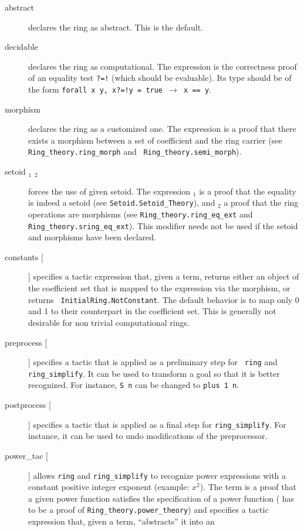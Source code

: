 \begin{description}
\item[abstract] declares the ring as abstract. This is the default.
\item[decidable \term] declares the ring as computational. The expression
  \term{} is
  the correctness proof of an equality test {\tt ?=!} (which should be
  evaluable). Its type should be of
  the form {\tt forall x y, x?=!y = true $\rightarrow$ x == y}.
\item[morphism \term] declares the ring as a customized one. The expression
  \term{} is
  a proof that there exists a morphism between a set of coefficient
  and the ring carrier (see {\tt Ring\_theory.ring\_morph} and {\tt
  Ring\_theory.semi\_morph}).
\item[setoid \term$_1$ \term$_2$] forces the use of given setoid. The
  expression \term$_1$ is a proof that the equality is indeed a setoid
  (see {\tt Setoid.Setoid\_Theory}), and \term$_2$ a proof that the
  ring operations are morphisms (see {\tt Ring\_theory.ring\_eq\_ext} and
  {\tt Ring\_theory.sring\_eq\_ext}). This modifier needs not be used if the
  setoid and morphisms have been declared.
\item[constants [\ltac]] specifies a tactic expression that, given a term,
  returns either an object of the coefficient set that is mapped to
  the expression via the morphism, or returns {\tt
  InitialRing.NotConstant}. The default behavior is to map only 0 and
  1 to their counterpart in the coefficient set. This is generally not
  desirable for non trivial computational rings.
\item[preprocess [\ltac]]
  specifies a tactic that is applied as a preliminary step for {\tt
  ring} and {\tt ring\_simplify}. It can be used to transform a goal
  so that it is better recognized. For instance, {\tt S n} can be
  changed to {\tt plus 1 n}.
\item[postprocess [\ltac]] specifies a tactic that is applied as a final step
  for {\tt ring\_simplify}. For instance, it can be used to undo
  modifications of the preprocessor.
\item[power\_tac {\term} [\ltac]] allows {\tt ring} and {\tt ring\_simplify} to
  recognize power expressions with a constant positive integer exponent
  (example: $x^2$). The term {\term} is a proof that a given power function
  satisfies the specification of a power function ({\term} has to be a
  proof of {\tt Ring\_theory.power\_theory}) and {\ltac} specifies a
  tactic expression that, given a term, ``abstracts'' it into an

\end{description}
